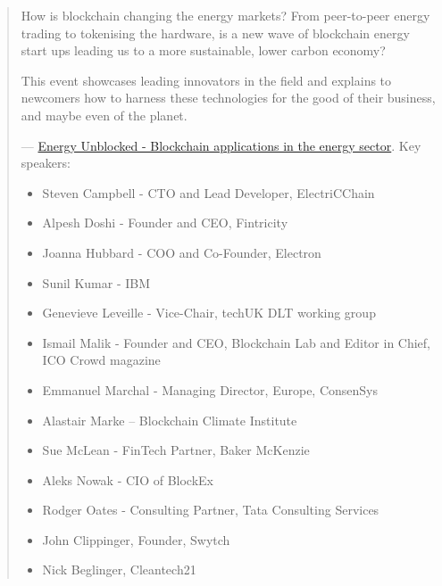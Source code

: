 % 
\begin{quotation}
How is blockchain changing the energy markets? From peer-to-peer energy trading to tokenising the hardware, is a new wave of blockchain energy start ups leading us to a more sustainable, lower carbon economy?

This event showcases leading innovators in the field and explains to newcomers how to harness these technologies for the good of their business, and maybe even of the planet.

--- \href{https://unblockedevents.com/events/energy-unblocked/}{Energy Unblocked - Blockchain applications in the energy sector}. Key speakers:
\begin{itemize}
	\item Steven Campbell - CTO and Lead Developer, ElectriCChain
    \item Alpesh Doshi - Founder and CEO, Fintricity
    \item Joanna Hubbard - COO and Co-Founder, Electron
    \item Sunil Kumar - IBM
    \item Genevieve Leveille - Vice-Chair, techUK DLT working group
    \item Ismail Malik - Founder and CEO, Blockchain Lab and Editor in Chief, ICO Crowd magazine
    \item Emmanuel Marchal - Managing Director, Europe, ConsenSys
    \item Alastair Marke – Blockchain Climate Institute
    \item Sue McLean - FinTech Partner, Baker McKenzie
    \item Aleks Nowak - CIO of BlockEx
    \item Rodger Oates - Consulting Partner, Tata Consulting Services
    \item John Clippinger, Founder, Swytch
    \item Nick Beglinger, Cleantech21
\end{itemize}
\end{quotation}






